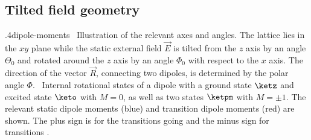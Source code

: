 \subsection{Tilted field geometry}
{.4}{dipole-moments}{ }
{\sfA~Illustration of the relevant axes and angles. The lattice lies in the $xy$ plane while the static external field $\vec{E}$ is tilted from the $z$ axis by an angle $\Theta_0$ and rotated around the $z$ axis by an angle $\Phi_0$ with respect to the $x$ axis. The direction of the vector $\vec{R}$, connecting two dipoles, is determined by the polar angle $\Phi$.
\sfB~Internal rotational states of a dipole with a ground state $\ketz$ and excited state $\keto$ with $M=0$, as well as two states $\ketpm$ with $M=\pm 1$. The relevant static dipole moments (blue) and transition dipole moments (red) are shown. The plus sign is for the transitions going  and the minus sign for transitions .}


